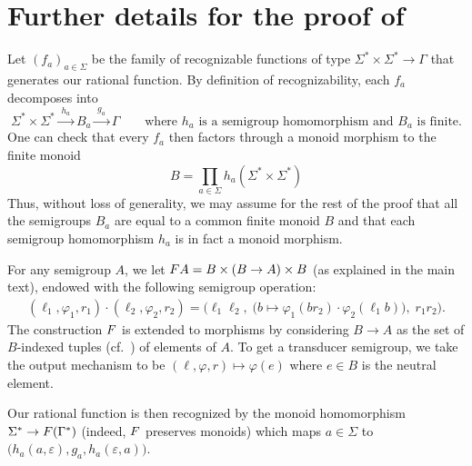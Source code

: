 \section{Further details for the proof of }

Let $(f_a)_{a\in\Sigma}$ be the family of recognizable functions of type
$\Sigma^* \times \Sigma^* \to \Gamma$ that generates our rational function. By
definition of recognizability, each $f_a$ decomposes into
\[ \Sigma^* \times \Sigma^* \xrightarrow{\;h_a\;} B_a \xrightarrow{\;g_a\;} \Gamma
  \qquad\text{where $h_a$ is a semigroup homomorphism and $B_a$ is finite.} \]
One can check that every $f_a$ then factors through a monoid morphism to the
finite monoid
\[ B = \prod_{a \in \Sigma} h_a(\Sigma^* \times \Sigma^*) \]
Thus, without loss of generality, we may assume for the rest of the proof that
all the semigroups $B_a$ are equal to a common finite monoid $B$ and that each
semigroup homomorphism $h_a$ is in fact a monoid morphism.

For any semigroup $A$, we let $\functor A = B \times (B\to A) \times B$ (as
explained in the main text), endowed with the following semigroup operation:
\begin{align*}
  (\ell_1,\varphi_1,r_1) \cdot (\ell_2,\varphi_2,r_2) = \Big(\ell_1\ell_2,\; \big(b  \mapsto \varphi_1(br_2) \cdot \varphi_2(\ell_1b)\big),\; r_1r_2\Big).
\end{align*}
The construction $\functor$ is extended to morphisms by considering $B\to A$ as the set of $B$-indexed tuples (cf.~) of
elements of $A$. To get a transducer semigroup, we take the output mechanism to
be $(\ell,\varphi,r) \mapsto \varphi(e)$ where $e \in B$ is the neutral element.

Our rational function is then recognized by the monoid homomorphism $\Sigma^*
\to \functor(\Gamma^*)$ (indeed, $\functor$ preserves monoids) which maps $a \in
\Sigma$ to $\big(h_a(a,\varepsilon),g_a,h_a(\varepsilon,a)\big)$.
